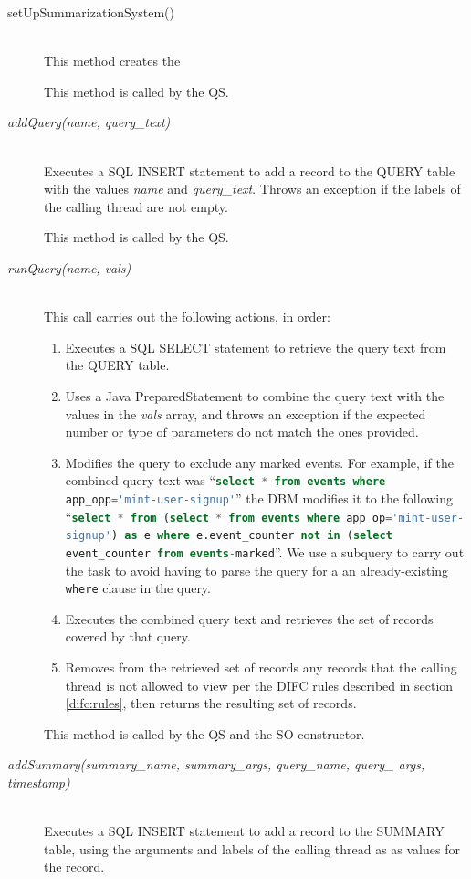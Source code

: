\begin{description}
  \item[setUpSummarizationSystem()] \ \\
    This method creates the 

    This method is called by the QS.
  \item[\emph{addQuery(name, query\_text)}] \ \\
    Executes a SQL INSERT statement to add a record
    to the QUERY table with the values \emph{name}
    and \emph{query\_text}.
    Throws an exception if the labels of the 
    calling thread are not empty.

    This method is called by the QS.
  \item[\emph{runQuery(name, vals)}] \ \\
    This call carries out the following actions,
    in order:
    \begin{enumerate}
      \item Executes a SQL SELECT statement to retrieve 
        the query text from the QUERY table.
      \item Uses a Java PreparedStatement to combine
        the query text with the values in the 
        \emph{vals} array,
        and throws an exception if the expected
        number or type of parameters do not match
        the ones provided.
      \item Modifies the query to exclude any marked events.
        For example, if the combined query text was 
        ``\lstinline[language=SQL]$select * from events where app_opp='mint-user-signup'$'' 
        the DBM modifies it to the following
        ``\lstinline[language=SQL]$select * from (select * from events where app_op='mint-user-signup') as e where e.event_counter not in (select event_counter from events-marked$''.
        We use a subquery to carry out the task to avoid
        having to parse the query for a an already-existing
        \lstinline$where$ clause in the query.
      \item Executes the combined query text and
        retrieves the set of records covered by that query.
      \item Removes from the retrieved set of records
        any records that
        the calling thread is not allowed
        to view per the DIFC rules described in section
        \ref{difc:rules}, then returns the resulting
        set of records.
    \end{enumerate}
    This method is called by the QS and the SO constructor.
  \item[\emph{addSummary(summary\_name, summary\_args, query\_name, query\_ args, timestamp)}] \ \\
    Executes a SQL INSERT statement to add a record to
    the SUMMARY table, using the arguments and labels
    of the calling thread as as values for the record.
    

\end{description}
